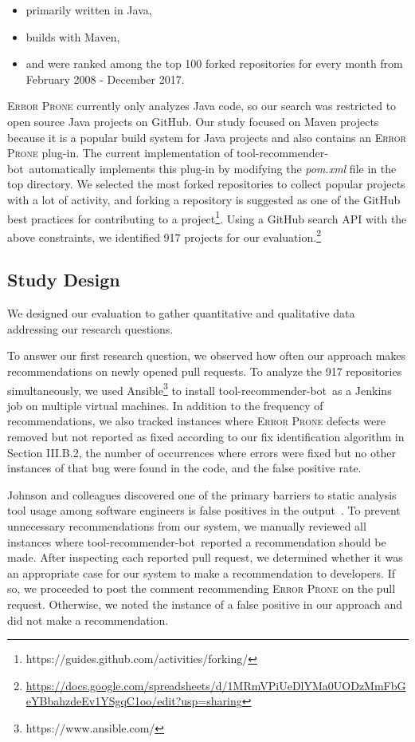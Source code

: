\documentclass[conference]{IEEEtran}
\newcommand{\tool}{tool-recommender-bot}
\newcommand{\pseudosection}[1]{\vspace{2mm} \noindent {\bf #1}}
\begin{document}
\begin{itemize}
\item primarily written in Java,
\item builds with Maven,
\item and were ranked among the top 100 forked repositories for every month from February 2008 - December 2017.
\end{itemize}

\textsc{Error Prone} currently only analyzes Java code, so our search was restricted to open source Java projects on GitHub. Our study focused on Maven projects because it is a popular build system for Java projects and also contains an \textsc{Error Prone} plug-in. The current implementation of \tool~automatically implements this plug-in by modifying the \textit{pom.xml} file in the top directory. We selected the most forked repositories to collect popular projects with a lot of activity, and forking a repository is suggested as one of the GitHub best practices for contributing to a project\footnote{https://guides.github.com/activities/forking/}. Using a GitHub search API with the above constraints, we identified 917 projects for our evaluation.\footnote{\url{https://docs.google.com/spreadsheets/d/1MRmVPiUeDlYMa0UODzMmFbGeYBbahzdeEv1YSgqC1oo/edit?usp=sharing}}

\subsection{Study Design}

We designed our evaluation to gather quantitative and qualitative data addressing our research questions.

\pseudosection{RQ1}

To answer our first research question, we observed how often our approach makes recommendations on newly opened pull requests. To analyze the 917 repositories simultaneously, we used Ansible\footnote{https://www.ansible.com/} to install \tool~as a Jenkins job on multiple virtual machines. In addition to the frequency of recommendations, we also tracked instances where \textsc{Error Prone} defects were removed but not reported as fixed according to our fix identification algorithm in Section III.B.2, the number of occurrences where errors were fixed but no other instances of that bug were found in the code, and the false positive rate.

Johnson and colleagues discovered one of the primary barriers to static analysis tool usage among software engineers is false positives in the output~\cite{Johnson2013Why}. To prevent unnecessary recommendations from our system, we manually reviewed all instances where \tool~reported a recommendation should be made. After inspecting each reported pull request, we determined whether it was an appropriate case for our system to make a recommendation to developers. If so, we proceeded to post the comment recommending \textsc{Error Prone} on the pull request. Otherwise, we noted the instance of a false positive in our approach and did not make a recommendation.
\end{document}
